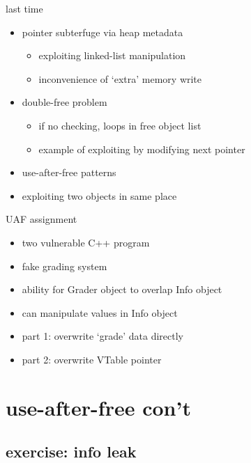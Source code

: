 \date{}
\title{}
\usepackage[outputdir=latex.out]{minted}

\begin{frame}
    \titlepage
\end{frame}



\begin{frame}{last time}
    \begin{itemize}
    \item pointer subterfuge via heap metadata
        \begin{itemize}
        \item exploiting linked-list manipulation
        \item inconvenience of `extra' memory write
        \end{itemize}
    \item double-free problem
        \begin{itemize}
        \item if no checking, loops in free object list
        \item example of exploiting by modifying next pointer
        \end{itemize}
    \item use-after-free patterns
    \item exploiting two objects in same place
    \end{itemize}
\end{frame}

\begin{frame}{UAF assignment}
    \begin{itemize}
    \item two vulnerable C++ program
    \item fake grading system
    \item ability for Grader object to overlap Info object
    \item can manipulate values in Info object
    \item part 1: overwrite `grade' data directly
    \item part 2: overwrite VTable pointer
    \end{itemize}
\end{frame}

\section{use-after-free con't}
\subsection{exercise: info leak}


